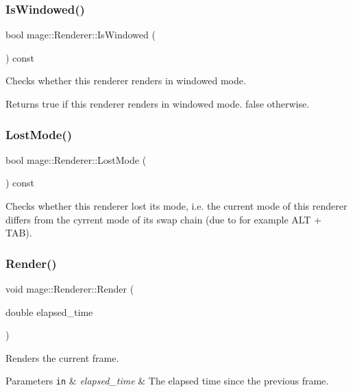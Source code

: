 \subsubsection{\texorpdfstring{Is\+Windowed()}{IsWindowed()}}
{\footnotesize\ttfamily bool mage\+::\+Renderer\+::\+Is\+Windowed (\begin{DoxyParamCaption}{ }\end{DoxyParamCaption}) const}

Checks whether this renderer renders in windowed mode.

\begin{DoxyReturn}{Returns}
{\ttfamily true} if this renderer renders in windowed mode. {\ttfamily false} otherwise. 
\end{DoxyReturn}
\hypertarget{classmage_1_1_renderer_afdde83a1e2bc9288f000fb2575c525d0}{}\label{classmage_1_1_renderer_afdde83a1e2bc9288f000fb2575c525d0} 
\subsubsection{\texorpdfstring{Lost\+Mode()}{LostMode()}}
{\footnotesize\ttfamily bool mage\+::\+Renderer\+::\+Lost\+Mode (\begin{DoxyParamCaption}{ }\end{DoxyParamCaption}) const}

Checks whether this renderer lost its mode, i.\+e. the current mode of this renderer differs from the cyrrent mode of its swap chain (due to for example A\+LT + T\+AB). \hypertarget{classmage_1_1_renderer_a95ac55eb4cc79a5712a50bfb78f67fe6}{}\label{classmage_1_1_renderer_a95ac55eb4cc79a5712a50bfb78f67fe6} 
\subsubsection{\texorpdfstring{Render()}{Render()}}
{\footnotesize\ttfamily void mage\+::\+Renderer\+::\+Render (\begin{DoxyParamCaption}\item[{double}]{elapsed\+\_\+time }\end{DoxyParamCaption})}

Renders the current frame.


\begin{DoxyParams}[1]{Parameters}
\mbox{\tt in}  & {\em elapsed\+\_\+time} & The elapsed time since the previous frame. \\
\hline
\end{DoxyParams}
\hypertarget{classmage_1_1_renderer_a95a34b64e815b0e5e95ce539bbd0f5a3}{}\label{classmage_1_1_renderer_a95a34b64e815b0e5e95ce539bbd0f5a3} 
